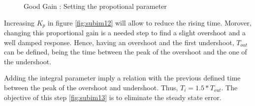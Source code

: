 \begin{figure}[H]
\hfill
{}
\hfill
{}

\caption{Good Gain : Setting the propotional parameter}
\end{figure}


Increasing $K_p$ in figure \ref{fig:subim12} will allow to reduce the rising time. Morover, changing this proportional gain is a needed step to find a slight overshoot and a well damped response. Hence, having an overshoot and the first undershoot, $T_{out}$ can be defined, being the time between the peak of the overshoot and the one of the undershoot.\par
\vspace{5mm}
Adding the integral parameter imply a relation with the previous defined time between the peak of the overshoot and undershoot. Thus, $T_i = 1.5 * T_{out}$. The objective of this step \ref{fig:subim13} is to eliminate the steady state error.



